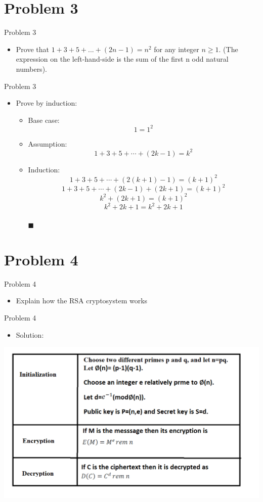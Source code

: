 \documentclass{beamer}
\begin{document}
\section{Problem 3}

\begin{frame}{Problem 3}
   \begin{itemize}
          \item Prove that $1+3+5+...+(2n-1)=n^2$ for any integer $n \geq 1$. (The expression on the left-hand-side is the sum of the first n odd natural numbers). 
      \end{itemize}
\end{frame}
\begin{frame}{Problem 3}
   \begin{itemize}
        \item Prove by induction:
        \begin{itemize}
            \item Base case: $$1 = 1^2$$
            \item Assumption: $$1 + 3 + 5 + \cdots + (2k - 1) = k^2$$
            \item Induction:    $$1 + 3 + 5 + \cdots + (2(k + 1) - 1) = (k + 1)^2$$
                                $$1 + 3 + 5 + \cdots + (2k - 1) + (2k + 1) = (k + 1)^2$$
                                $$k^2 + (2k + 1) = (k + 1)^2$$
                                $$k^2 + 2k + 1 = k^2 + 2k + 1$$
                                \\ \hspace{10cm} {\tiny $\blacksquare$}
        \end{itemize}
    \end{itemize}
\end{frame}

\section{Problem 4}

\begin{frame}{Problem 4}
    \begin{itemize}
        \item Explain how the RSA cryptosystem works
    \end{itemize}
\end{frame}

\begin{frame}{Problem 4}
    \begin{itemize}
        \item Solution:
    \end{itemize}
    \centering \includegraphics[width=.7\linewidth]{p2.png} 
\end{frame}
\end{document}
